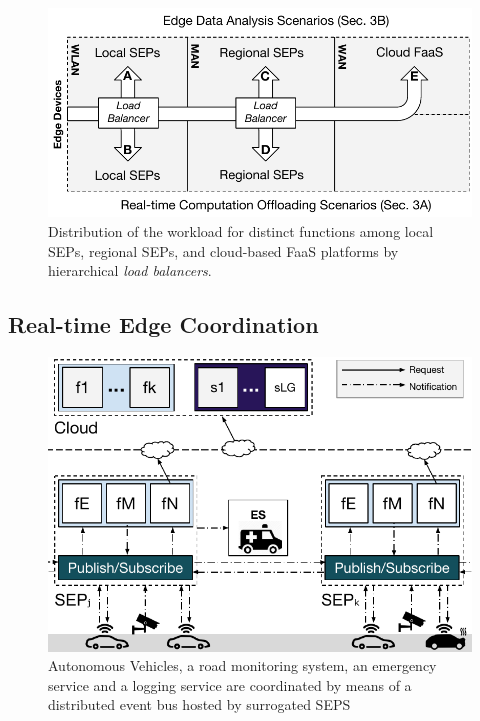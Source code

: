 \begin{figure}[b]
	\centering
	\includegraphics[width=\linewidth]{Figs/Edge_Load_Placement}
	\caption{Distribution of the workload for distinct functions among local SEPs, regional SEPs, and cloud-based FaaS platforms by hierarchical \textit{load balancers}.}
	\label{fig:Edge_Load_Placement}
\end{figure}





\subsection{Real-time Edge Coordination}\label{sec:SEP_RTEC}

\begin{figure}[tbp]
	\centering
	\includegraphics[width=1\linewidth]{Figs/Edge_Coordination_AVs_wide.pdf}
	\caption{Autonomous Vehicles, a road monitoring system, an emergency service and a logging service are coordinated by means of a distributed event bus hosted by surrogated SEPS}
	\label{fig:Edge_Coordination_AVs}
\end{figure}


